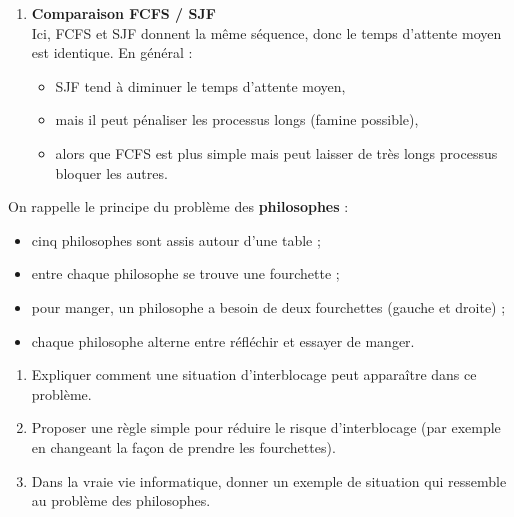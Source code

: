 \documentclass[11pt]{article}
\begin{document}
{\begin{enumerate}
			\begin{itemize}
				\item \textbf{Quantum = 1} (unité de temps) :
				
				Séquence possible (par unités de temps) :\\
				\texttt{A B A B C A D C E A D C E A D E D E}\\
				(on voit bien l’alternance très fréquente entre processus)
				
				\item \textbf{Quantum = 3} :
				
				Séquence possible :\\
				\texttt{A A A B B C C C A A D D D E E E D E}\\
				(le processeur reste plus longtemps sur le même processus avant de passer au suivant)
			\end{itemize}
			
			\item \textbf{Comparaison FCFS / SJF}\\
			Ici, FCFS et SJF donnent la même séquence, donc le temps d’attente moyen est identique.  
			En général :
			\begin{itemize}
				\item SJF tend à diminuer le temps d’attente moyen,
				\item mais il peut pénaliser les processus longs (famine possible),
				\item alors que FCFS est plus simple mais peut laisser de très longs processus bloquer les autres.
			\end{itemize}
		\end{enumerate}
	}
	
	
	
	On rappelle le principe du problème des \textbf{philosophes} :
	
	\begin{itemize}
		\item cinq philosophes sont assis autour d’une table ;
		\item entre chaque philosophe se trouve une fourchette ;
		\item pour manger, un philosophe a besoin de deux fourchettes (gauche et droite) ;
		\item chaque philosophe alterne entre réfléchir et essayer de manger.
	\end{itemize}
	
	\begin{enumerate}
		\item Expliquer comment une situation d’interblocage peut apparaître dans ce problème.
		\item Proposer une règle simple pour réduire le risque d’interblocage (par exemple en changeant la façon de prendre les fourchettes).
		\item Dans la vraie vie informatique, donner un exemple de situation qui ressemble au problème des philosophes.
	\end{enumerate}
	
\end{document}
